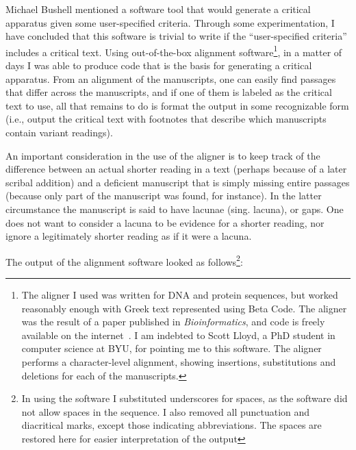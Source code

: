\documentclass[onecolumn, 12pt]{article}
\begin{document}
Michael Bushell mentioned a software tool that would generate a critical
apparatus given some user-specified criteria.  Through some experimentation, I
have concluded that this software is trivial to write if the ``user-specified
criteria'' includes a critical text.  Using out-of-the-box alignment
software\footnote{The aligner I used was written for DNA and protein sequences,
but worked reasonably enough with Greek text represented using Beta Code.  The
aligner was the result of a paper published in \emph{Bioinformatics}, and code
is freely available on the internet~\cite{lee-2002-sequence-alignment-poa}.  I
am indebted to Scott Lloyd, a PhD student in computer science at BYU, for
pointing me to this software.  The aligner performs a character-level
alignment, showing insertions, substitutions and deletions for each of the
manuscripts.}, in a matter of days I was able to produce code that is the basis
for generating a critical apparatus.  From an alignment of the manuscripts, one
can easily find passages that differ across the manuscripts, and if one of them
is labeled as the critical text to use, all that remains to do is format the
output in some recognizable form (i.e., output the critical text with footnotes
that describe which manuscripts contain variant readings).

An important consideration in the use of the aligner is to keep track of the
difference between an actual shorter reading in a text (perhaps because of a
later scribal addition) and a deficient manuscript that is simply missing
entire passages (because only part of the manuscript was found, for instance).
In the latter circumstance the manuscript is said to have lacunae (sing.
lacuna), or gaps.  One does not want to consider a lacuna to be evidence for a
shorter reading, nor ignore a legitimately shorter reading as if it were a
lacuna.

The output of the alignment software looked as follows\footnote{In using the
software I substituted underscores for spaces, as the software did not allow
spaces in the sequence.  I also removed all punctuation and diacritical marks,
except those indicating abbreviations.  The spaces are restored here for easier
interpretation of the output}:
\end{document}
